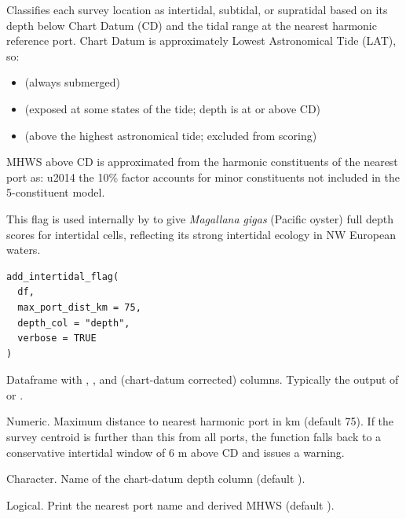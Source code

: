 \documentclass[a4paper]{book}
\begin{document}
\begin{Description}
Classifies each survey location as intertidal, subtidal, or supratidal
based on its depth below Chart Datum (CD) and the tidal range at the
nearest harmonic reference port. Chart Datum is approximately Lowest
Astronomical Tide (LAT), so:
\begin{itemize}

\item{}      (always submerged)
\item{}   
(exposed at some states of the tide; depth is at or above CD)
\item{}   
(above the highest astronomical tide; excluded from scoring)

\end{itemize}


MHWS above CD is approximated from the harmonic constituents of the
nearest port as:  \bsl{}u2014 the 10\% factor accounts
for minor constituents not included in the 5-constituent model.

This flag is used internally by  to give \emph{Magallana
gigas} (Pacific oyster) full depth scores for intertidal cells, reflecting
its strong intertidal ecology in NW European waters.
\end{Description}
%
\begin{Usage}
\begin{verbatim}
add_intertidal_flag(
  df,
  max_port_dist_km = 75,
  depth_col = "depth",
  verbose = TRUE
)
\end{verbatim}
\end{Usage}
%
\begin{Arguments}
\begin{ldescription}
\item[\code{df}] Dataframe with , , and  (chart-datum corrected)
columns. Typically the output of  or
.

\item[\code{max\_port\_dist\_km}] Numeric. Maximum distance to nearest harmonic port
in km (default 75). If the survey centroid is further than this from all
ports, the function falls back to a conservative intertidal window of 6 m
above CD and issues a warning.

\item[\code{depth\_col}] Character. Name of the chart-datum depth column
(default ).

\item[\code{verbose}] Logical. Print the nearest port name and derived MHWS
(default ).
\end{ldescription}
\end{Arguments}
\end{document}
